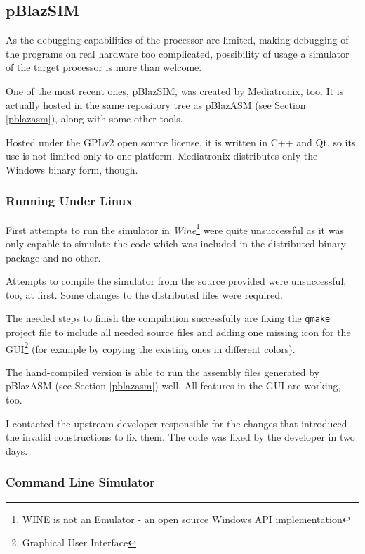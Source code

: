         \subsection{pBlazSIM}\label{pblazsim}

        As the debugging capabilities of the processor are limited, making debugging of the programs on real hardware too complicated, possibility of usage a simulator of the target processor is more than welcome.

        One of the most recent ones, pBlazSIM, was created by Mediatronix, too. It is actually hosted in the same repository tree as pBlazASM (see Section \ref{pblazasm}), along with some other tools.\cite{PblazSim} \cite{PblazAsmRepo}

        Hosted under the GPLv2 open source license, it is written in C++ and Qt, so its use is not limited only to one platform. Mediatronix distributes only the Windows binary form, though.

            \subsubsection{Running Under Linux}

            First attempts to run the simulator in \emph{Wine}\footnote{WINE is not an Emulator - an open source Windows API implementation} were quite unsuccessful as it was only capable to simulate the code which was included in the distributed binary package and no other.

            Attempts to compile the simulator from the source provided were unsuccessful, too, at first. Some changes to the distributed files were required.

            The needed steps to finish the compilation successfully are fixing the \texttt{qmake} project file to include all needed source files and adding one missing icon for the GUI\footnote{Graphical User Interface} (for example by copying the existing ones in different colors).

            The hand-compiled version is able to run the assembly files generated by pBlazASM (see Section \ref{pblazasm}) well. All features in the GUI are working, too.

            I contacted the upstream developer responsible for the changes that introduced the invalid constructions to fix them. The code was fixed by the developer in two days.

            \subsubsection{Command Line Simulator}

